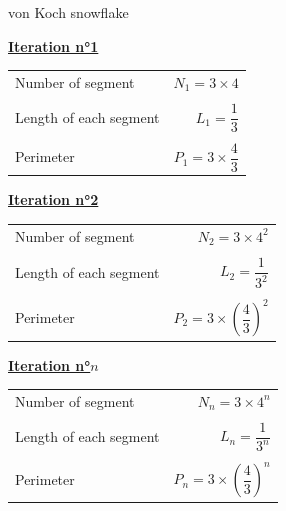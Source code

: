 \documentclass[usenames, dvipsnames, aspectratio=169]{beamer}
\begin{document}
\begin{frame}[t, c]{von Koch snowflake}{}
\begin{minipage}{.68\textwidth}
\begin{overprint}
      \begin{center}
        \underline{\textbf{Iteration n°1}}
      \end{center}
      
      \bigskip
      
      \begin{tabular}{lr}
        Number of segment & $N_1 = 3 \times 4$ \\
        \\
        Length of each segment & $L_1 = \dfrac{1}{3}$ \\
        \\
        Perimeter & $P_1 = 3 \times \dfrac{4}{3}$
      \end{tabular}


      \begin{center}
        \underline{\textbf{Iteration n°2}}
      \end{center}
      
      \bigskip
      
      \begin{tabular}{lr}
        Number of segment & $N_2 = 3 \times 4^2$ \\
        \\
        Length of each segment & $L_2 = \dfrac{1}{3^2}$ \\
        \\
        Perimeter & $P_2 = 3 \times \left( \dfrac{4}{3} \right)^2$
      \end{tabular}

      \begin{center}
        \underline{\textbf{Iteration n°$n$}}
      \end{center}
      
      \bigskip
      
      \begin{tabular}{lr}
        Number of segment & $N_n = 3 \times 4^n$ \\
        \\
        Length of each segment & $L_n = \dfrac{1}{3^n}$ \\
        \\
        Perimeter & $P_n = 3 \times \left( \dfrac{4}{3} \right)^n$
      \end{tabular}

    \end{overprint}
  \end{minipage}

  \vfill
\end{frame}
\end{document}
